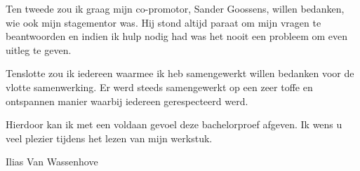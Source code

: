 Ten tweede zou ik graag mijn co-promotor, Sander Goossens, willen bedanken, wie ook mijn stagementor was. Hij stond altijd paraat om mijn vragen te beantwoorden en indien ik hulp nodig had was het nooit een probleem om even uitleg te geven.

Tenslotte zou ik iedereen waarmee ik heb samengewerkt willen bedanken voor de vlotte samenwerking. Er werd steeds samengewerkt op een zeer toffe en ontspannen manier waarbij iedereen gerespecteerd werd.

Hierdoor kan ik met een voldaan gevoel deze bachelorproef afgeven. Ik wens u veel plezier tijdens het lezen van mijn werkstuk.

Ilias Van Wassenhove


